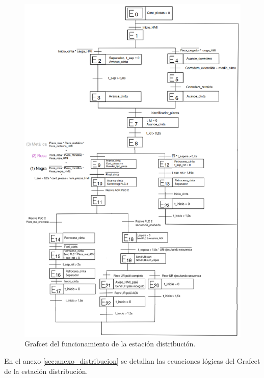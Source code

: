 \clearpage

\begin{figure} [h!]
  \begin{center}
    \includegraphics[width=14cm]{figs/grafcet_distribucion}
  \end{center}
  \caption{\centering Grafcet del funcionamiento de la estación distribución.}
  \label{fig:grafcet_distribucion}
\end{figure} 

En el anexo \ref{sec:anexo_distribucion} se detallan las ecuaciones lógicas del Grafcet de la estación distribución.

\clearpage


